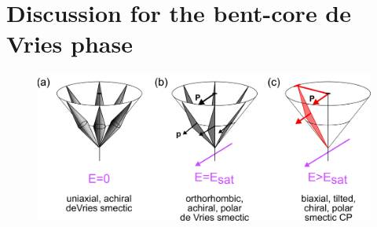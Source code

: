 \documentclass[aagreenthesis]{subfiles}
\begin{document}
\section{Discussion for the bent-core de Vries phase}
\begin{figure}[h!]
    \centering
    \includegraphics{figs/pal30/deVries/dvAlign.png}
    \caption{\label{}}
\end{figure}




\biblio
\end{document}
